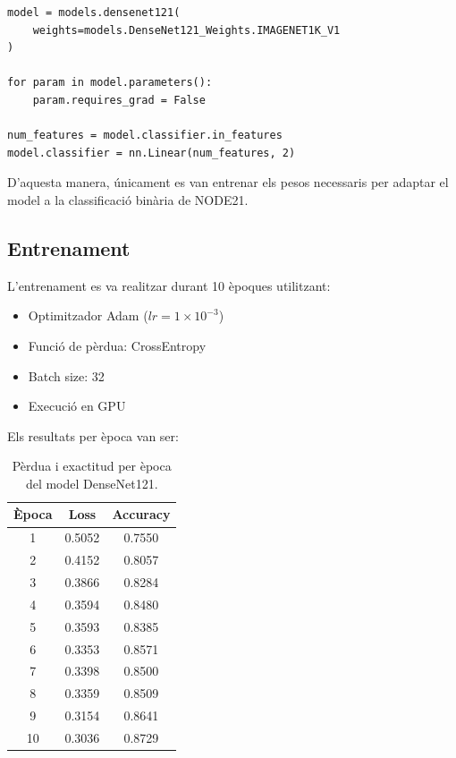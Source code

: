 \documentclass[12pt,a4paper]{article}
\begin{document}
\begin{lstlisting}[style=mypython]
model = models.densenet121(
    weights=models.DenseNet121_Weights.IMAGENET1K_V1
)

for param in model.parameters():
    param.requires_grad = False

num_features = model.classifier.in_features
model.classifier = nn.Linear(num_features, 2)
\end{lstlisting}

D’aquesta manera, únicament es van entrenar els pesos necessaris per adaptar el model a
la classificació binària de NODE21.

\subsection{Entrenament}

L’entrenament es va realitzar durant 10 èpoques utilitzant:

\begin{itemize}
    \item Optimitzador Adam ($lr = 1 \times 10^{-3}$)
    \item Funció de pèrdua: CrossEntropy
    \item Batch size: 32
    \item Execució en GPU
\end{itemize}

Els resultats per època van ser:

\begin{table}[h!]
\centering
\begin{tabular}{c|c|c}
\hline
\textbf{Època} & \textbf{Loss} & \textbf{Accuracy} \\
\hline
1 & 0.5052 & 0.7550 \\
2 & 0.4152 & 0.8057 \\
3 & 0.3866 & 0.8284 \\
4 & 0.3594 & 0.8480 \\
5 & 0.3593 & 0.8385 \\
6 & 0.3353 & 0.8571 \\
7 & 0.3398 & 0.8500 \\
8 & 0.3359 & 0.8509 \\
9 & 0.3154 & 0.8641 \\
10 & 0.3036 & 0.8729 \\
\hline
\end{tabular}
\caption{Pèrdua i exactitud per època del model DenseNet121.}
\label{tab:densenet121_training}
\end{table}
\end{document}
